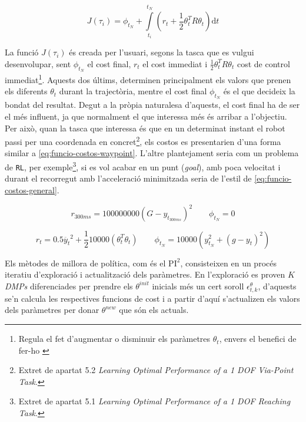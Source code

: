 \documentclass[12pt,a4paper,final,twoside]{article}
\begin{document}
\begin{equation}\label{eq:PI2-cost-function}
J(\tau_i) = \phi_{t_N} + \int\limits_{t_i}^{t_N} (r_t + \frac{1}{2} \theta_t^T R \theta_t) \mathrm{d}t
\end{equation}

La funció $J(\tau_i)$ és creada per l'usuari, segons la tasca que es vulgui desenvolupar, sent $\phi_{t_N}$ el cost final, $r_t$ el cost immediat i $\frac{1}{2} \theta_t^T R \theta_t$ cost de control immediat\footnote{Regula el fet d'augmentar o disminuir els paràmetres $\theta_t$, envers el benefici de fer-ho \cite{Hennig2011}}. Aquests dos últims, determinen principalment els valors que prenen els diferents $\theta_t$ durant la trajectòria, mentre el cost final $\phi_{t_N}$ és el que decideix la bondat del resultat. Degut a la pròpia naturalesa d'aquests, el cost final ha de ser el més influent, ja que normalment el que interessa més és arribar a l'objectiu. Per això, quan la tasca que interessa és que en un determinat instant el robot passi per una coordenada en concret\footnote{Extret de \cite{Schaal2010} apartat 5.2 \textit{Learning Optimal Performance of a 1 DOF Via-Point Task}.}, els costos es presentarien d'una forma similar a \eqref{eq:funcio-costos-waypoint}. L'altre plantejament seria com un problema de \texttt{RL}, per exemple\footnote{Extret de \cite{Schaal2010} apartat 5.1 \textit{Learning Optimal Performance of a 1 DOF Reaching Task}.}, si es vol acabar en un punt (\textit{goal}), amb poca velocitat i durant el recorregut amb l'acceleració minimitzada seria de l'estil de \eqref{eq:funcio-costos-general}.

\begin{equation}
r_{300ms} = 100000000(G-y_{t_{300ms}})^2    \qquad {}  \phi_{t_N} = 0\label{eq:funcio-costos-waypoint}
\end{equation}

\begin{equation}
r_t = 0.5\ddot{y_t}^2 + \frac{1}{2}10000( \theta_t^T \theta_t)    \qquad {}  \phi_{t_N} = 10000(y_{t_N}^2 + (g-y_t)^2)\label{eq:funcio-costos-general}
\end{equation}

Els mètodes de millora de política, com és el $\mathrm{PI^2}$, consisteixen en un procés iteratiu d'exploració i actualització dels paràmetres. En l'exploració es proven $K$ \textit{DMPs} diferenciades per prendre els $\theta^{init}$ inicials més un cert soroll $\epsilon_{t,k}^{\theta}$, d'aquests se'n calcula les respectives funcions de cost i a partir d'aquí s'actualizen els valors dels paràmetres per donar $\theta^{new}$ que són els actuals.
\end{document}
